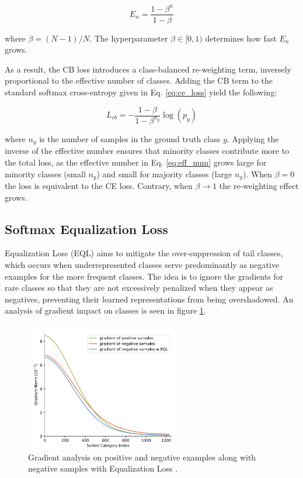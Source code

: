 \begin{equation}
    \label{eq:eff_num}
    E_n = \frac{1-\beta^n}{1-\beta}
\end{equation}

\noindent where $\beta = (N-1)/N$. The hyperparameter $\beta \in [0,1)$ determines how fast $E_n$ grows.

As a result, the CB loss introduces a class-balanced re-weighting term, inversely proportional to the effective number of classes. Adding the CB term to the standard softmax cross-entropy given in Eq. \eqref{eq:ce_loss} yield the following:

\begin{equation}
    \label{eq:cb_loss}
    L_{cb} = - \frac{1 - \beta}{1 - \beta^{n_y}} \log(p_y)
\end{equation}

\noindent where $n_y$ is the number of samples in the ground truth class $y$. Applying the inverse of the effective number ensures that minority classes contribute more to the total loss, as the effective number in Eq. \eqref{eq:eff_num} grows large for minority classes (small $n_y$) and small for majority classes (large $n_y$). When $\beta = 0$ the loss is equivalent to the CE loss. Contrary, when $\beta \longrightarrow 1$ the re-weighting effect grows.


\subsection{Softmax Equalization Loss}
\label{sec:seql}
Equalization Loss (EQL) \cite{tan2020equalizationlosslongtailedobject} aims to mitigate the over-suppression of tail classes, which occurs when underrepresented classes serve predominantly as negative examples for the more frequent classes. The idea is to ignore the gradients for rare classes so that they are not excessively penalized when they appear as negatives, preventing their learned representations from being overshadowed. An analysis of gradient impact on classes is seen in figure \ref{fig:eql_gradients}.

\begin{figure}[ht]
    \centering
    \includegraphics[width=0.6\textwidth]{Images/gradient_analysis.png} 
    \caption{Gradient analysis on positive and negative examples along with negative samples with Equalization Loss \cite{tan2020equalizationlosslongtailedobject}.}
    \label{fig:eql_gradients} 
\end{figure}

